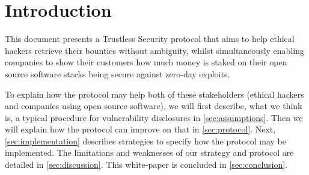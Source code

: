 \section{Introduction}
\label{sec:introduction}
This document presents a Trustless Security protocol that aims to help ethical hackers retrieve their bounties without ambiguity, whilst simultaneously enabling companies to show their customers how much money is staked on their open source software stacks being secure against zero-day exploits.

To explain how the protocol may help both of these stakeholders (ethical hackers and companies using open source software), we will first describe, what we think is, a typical procedure for vulnerability disclosures in \cref{sec:assumptions}. Then we will explain how the protocol can improve on that in \cref{sec:protocol}. Next, \cref{sec:implementation} describes strategies to specify how the protocol may be implemented. The limitations and weaknesses of our strategy and protocol are detailed in \cref{sec:discussion}. This white-paper is concluded in \cref{sec:conclusion}.